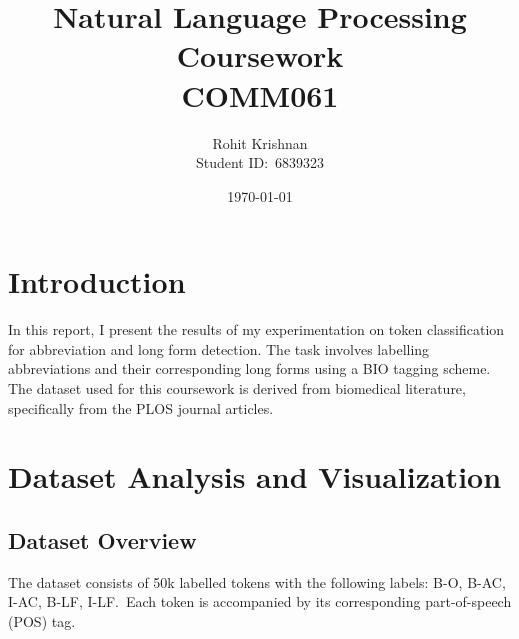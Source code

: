 \documentclass[a4paper,11pt]{article}
\title{Natural Language Processing Coursework \\ \large COMM061}
\author{Rohit Krishnan \\ Student ID:\ 6839323}
\date{\today}
\begin{document}
\maketitle


\section{Introduction}\label{sec:introduction}
In this report, I present the results of my experimentation on
token classification for abbreviation and long form detection.
The task involves labelling abbreviations and their corresponding
long forms using a BIO tagging scheme. The dataset used for this
coursework is derived from biomedical literature, specifically
from the PLOS journal articles.

\section{Dataset Analysis and Visualization}\label{sec:dataset-analysis}
\subsection{Dataset Overview}
The dataset consists of 50k labelled tokens with the following labels: B-O,
B-AC, I-AC, B-LF, I-LF.\ Each token is accompanied by its corresponding
part-of-speech (POS) tag.
\end{document}
